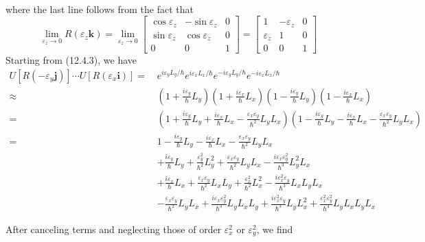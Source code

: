 \documentclass[../principles-of-quantum-mechanics.tex]{subfiles}
\begin{document}
\begin{questions}
\begin{solution}
\begin{align*}
		\end{align*}
		where the last line follows from the fact that 
		$$\lim_{\varepsilon_z\to0}R(\varepsilon_z\mathbf{k}) = \lim_{\varepsilon_z\to0}\begin{bmatrix}\cos\varepsilon_z & -\sin\varepsilon_z & 0 \\ \sin\varepsilon_z & \cos\varepsilon_z & 0 \\ 0 & 0 & 1 \end{bmatrix} = \begin{bmatrix}1 & -\varepsilon_z & 0 \\ \varepsilon_z & 1 & 0 \\ 0 & 0 & 1\end{bmatrix}$$
		Starting from (12.4.3), we have
		\begin{align*}
			U[R(-\varepsilon_y\mathbf{j})]\cdots U[R(\varepsilon_x\mathbf{i})] =\,&e^{i\varepsilon_yL_y/\hbar}e^{i\varepsilon_xL_x/\hbar}e^{-i\varepsilon_yL_y/\hbar}e^{-i\varepsilon_xL_x/\hbar} \\
			\approx\,&(1 + \tfrac{i\varepsilon_y}{\hbar}L_y)(1 + \tfrac{i\varepsilon_x}{\hbar}L_x)(1 - \tfrac{i\varepsilon_y}{\hbar}L_y)(1 - \tfrac{i\varepsilon_x}{\hbar}L_x) \\
			=\,&(1 + \tfrac{i\varepsilon_y}{\hbar}L_y + \tfrac{i\varepsilon_x}{\hbar}L_x - \tfrac{\varepsilon_x\varepsilon_y}{\hbar^2}L_yL_x)(1 - \tfrac{i\varepsilon_y}{\hbar}L_y - \tfrac{i\varepsilon_x}{\hbar}L_x - \tfrac{\varepsilon_x\varepsilon_y}{\hbar^2}L_yL_x) \\
			=\,&1 - \tfrac{i\varepsilon_y}{\hbar}L_y - \tfrac{i\varepsilon_x}{\hbar}L_x - \tfrac{\varepsilon_x\varepsilon_y}{\hbar^2}L_yL_x \\
			&+ \tfrac{i\varepsilon_y}{\hbar}L_y + \tfrac{\varepsilon_y^2}{\hbar^2}L_y^2 + \tfrac{\varepsilon_x\varepsilon_y}{\hbar^2}L_yL_x - \tfrac{i\varepsilon_x\varepsilon_y^2}{\hbar^3}L_y^2L_x \\
			&+ \tfrac{i\varepsilon_x}{\hbar}L_x + \tfrac{\varepsilon_x\varepsilon_y}{\hbar^2}L_xL_y + \tfrac{\varepsilon_x^2}{\hbar^2}L_x^2 - \tfrac{i\varepsilon_x^2\varepsilon_y}{\hbar^3}L_xL_yL_x \\
			&- \tfrac{\varepsilon_x\varepsilon_y}{\hbar^2}L_yL_x + \tfrac{i\varepsilon_x\varepsilon_y^2}{\hbar^3}L_yL_xL_y + \tfrac{i\varepsilon_x^2\varepsilon_y}{\hbar^3}L_yL_x^2 + \tfrac{\varepsilon_x^2\varepsilon_y^2}{\hbar^4}L_yL_xL_yL_x
		\end{align*}
	\end{solution}
	\begin{solution}
		After canceling terms and neglecting those of order $\varepsilon_x^2$ or $\varepsilon_y^2$, we find

\end{solution}
\end{questions}
\end{document}
